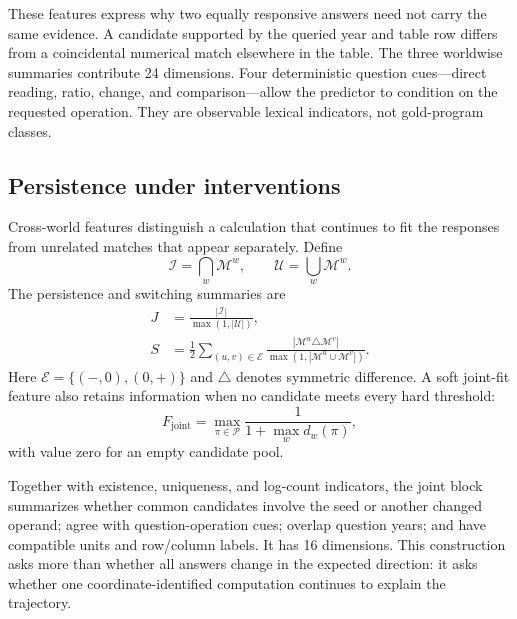 These features express why two equally responsive answers need not carry the same evidence. A candidate supported by the queried year and table row differs from a coincidental numerical match elsewhere in the table. The three worldwise summaries contribute 24 dimensions. Four deterministic question cues---direct reading, ratio, change, and comparison---allow the predictor to condition on the requested operation. They are observable lexical indicators, not gold-program classes.

\subsection{Persistence under interventions}
Cross-world features distinguish a calculation that continues to fit the responses from unrelated matches that appear separately. Define
\begin{equation}
 \mathcal I=\bigcap_w\mathcal M^w,\qquad
 \mathcal U=\bigcup_w\mathcal M^w.
\end{equation}
The persistence and switching summaries are
\begin{align}
 J&=\frac{|\mathcal I|}{\max(1,|\mathcal U|)},\\
 S&=\frac12\sum_{(u,v)\in\mathcal E}
 \frac{|\mathcal M^u\triangle\mathcal M^v|}
 {\max(1,|\mathcal M^u\cup\mathcal M^v|)}.
 \label{eq:persistence}
\end{align}
Here $\mathcal E=\{(-,0),(0,+)\}$ and $\triangle$ denotes symmetric difference. A soft joint-fit feature also retains information when no candidate meets every hard threshold:
\begin{equation}
 F_{\mathrm{joint}}=\max_{\pi\in\mathcal P}
 \frac{1}{1+\max_w d_w(\pi)},
 \label{eq:jointfit}
\end{equation}
with value zero for an empty candidate pool.

Together with existence, uniqueness, and log-count indicators, the joint block summarizes whether common candidates involve the seed or another changed operand; agree with question-operation cues; overlap question years; and have compatible units and row/column labels. It has 16 dimensions. This construction asks more than whether all answers change in the expected direction: it asks whether one coordinate-identified computation continues to explain the trajectory.

